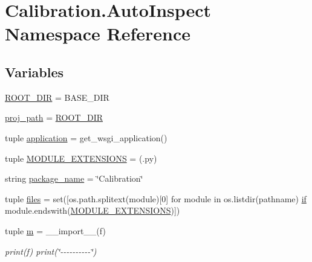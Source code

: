 \hypertarget{namespace_calibration_1_1_auto_inspect}{}\section{Calibration.\+Auto\+Inspect Namespace Reference}
\label{namespace_calibration_1_1_auto_inspect}
\subsection*{Variables}
\begin{DoxyCompactItemize}
\item 
\hyperlink{namespace_calibration_1_1_auto_inspect_a371c32fa376ba0742bdfde31c73d9317}{R\+O\+O\+T\+\_\+\+D\+I\+R} = B\+A\+S\+E\+\_\+\+D\+I\+R
\item 
\hyperlink{namespace_calibration_1_1_auto_inspect_a5d5e7eb538493d988b4df04bf7f01f17}{proj\+\_\+path} = \hyperlink{namespace_calibration_1_1_auto_inspect_a371c32fa376ba0742bdfde31c73d9317}{R\+O\+O\+T\+\_\+\+D\+I\+R}
\item 
tuple \hyperlink{namespace_calibration_1_1_auto_inspect_ae00a1e9313d00bdbb0b4e2c7cb3b363b}{application} = get\+\_\+wsgi\+\_\+application()
\item 
tuple \hyperlink{namespace_calibration_1_1_auto_inspect_ad2c387d0241a2d154858091e8c0f40d3}{M\+O\+D\+U\+L\+E\+\_\+\+E\+X\+T\+E\+N\+S\+I\+O\+N\+S} = (\textquotesingle{}.py\textquotesingle{})
\item 
string \hyperlink{namespace_calibration_1_1_auto_inspect_a60adc5b4a66d31841cef737720b2825a}{package\+\_\+name} = \char`\"{}Calibration\char`\"{}
\item 
tuple \hyperlink{namespace_calibration_1_1_auto_inspect_aa4b6552ca86efb064df344d4f075f68a}{files} = set(\mbox{[}os.\+path.\+splitext(module)\mbox{[}0\mbox{]} for module in os.\+listdir(pathname) \hyperlink{bootstrap_8min_8js_ab46cc49ddd78779f76bf855060e8f4db}{if} module.\+endswith(\hyperlink{namespace_calibration_1_1_auto_inspect_ad2c387d0241a2d154858091e8c0f40d3}{M\+O\+D\+U\+L\+E\+\_\+\+E\+X\+T\+E\+N\+S\+I\+O\+N\+S})\mbox{]})
\item 
tuple \hyperlink{namespace_calibration_1_1_auto_inspect_a49668bb1b794ae779ef7026664839469}{m} = \+\_\+\+\_\+import\+\_\+\+\_\+(f)
\begin{DoxyCompactList}\small\item\em print(f) print(\char`\"{}-\/-\/-\/-\/-\/-\/-\/-\/-\/-\/\char`\"{}) \end{DoxyCompactList}\item 

\end{DoxyCompactItemize}
